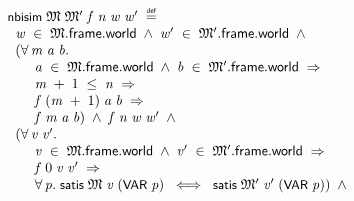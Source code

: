 \documentclass[letterpaper]{article}
\renewcommand{\HOLConst}[1]{{\textsf{\upshape\small #1}}}
\newenvironment{holmath}{\begin{displaymath}\begin{array}{l}}{\end{array}\end{displaymath}\ignorespacesafterend}
\begin{document}
\begin{holmath}
  \HOLConst{nbisim}\;\HOLFreeVar{\ensuremath{\mathfrak{M}}}\;\HOLFreeVar{\ensuremath{\mathfrak{M}'}}\;\HOLFreeVar{f}\;\HOLFreeVar{n}\;\HOLFreeVar{w}\;\HOLFreeVar{w\sp{\prime}}\;\HOLSymConst{\HOLTokenDefEquality{}}\\
\;\;\HOLFreeVar{w}\;\HOLSymConst{\HOLTokenIn{}}\;\HOLFreeVar{\ensuremath{\mathfrak{M}}}.\HOLFieldName{frame}.\HOLFieldName{world}\;\HOLSymConst{\HOLTokenConj{}}\;\HOLFreeVar{w\sp{\prime}}\;\HOLSymConst{\HOLTokenIn{}}\;\HOLFreeVar{\ensuremath{\mathfrak{M}'}}.\HOLFieldName{frame}.\HOLFieldName{world}\;\HOLSymConst{\HOLTokenConj{}}\\
\;\;(\HOLSymConst{\HOLTokenForall{}}\HOLBoundVar{m}\;\HOLBoundVar{a}\;\HOLBoundVar{b}.\\
\;\;\;\;\;\;\;\HOLBoundVar{a}\;\HOLSymConst{\HOLTokenIn{}}\;\HOLFreeVar{\ensuremath{\mathfrak{M}}}.\HOLFieldName{frame}.\HOLFieldName{world}\;\HOLSymConst{\HOLTokenConj{}}\;\HOLBoundVar{b}\;\HOLSymConst{\HOLTokenIn{}}\;\HOLFreeVar{\ensuremath{\mathfrak{M}'}}.\HOLFieldName{frame}.\HOLFieldName{world}\;\HOLSymConst{\HOLTokenImp{}}\\
\;\;\;\;\;\;\;\HOLBoundVar{m}\;\HOLSymConst{\ensuremath{+}}\;\HOLNumLit{1}\;\HOLSymConst{\HOLTokenLeq{}}\;\HOLFreeVar{n}\;\HOLSymConst{\HOLTokenImp{}}\\
\;\;\;\;\;\;\;\HOLFreeVar{f}\;(\HOLBoundVar{m}\;\HOLSymConst{\ensuremath{+}}\;\HOLNumLit{1})\;\HOLBoundVar{a}\;\HOLBoundVar{b}\;\HOLSymConst{\HOLTokenImp{}}\\
\;\;\;\;\;\;\;\HOLFreeVar{f}\;\HOLBoundVar{m}\;\HOLBoundVar{a}\;\HOLBoundVar{b})\;\HOLSymConst{\HOLTokenConj{}}\;\HOLFreeVar{f}\;\HOLFreeVar{n}\;\HOLFreeVar{w}\;\HOLFreeVar{w\sp{\prime}}\;\HOLSymConst{\HOLTokenConj{}}\\
\;\;(\HOLSymConst{\HOLTokenForall{}}\HOLBoundVar{v}\;\HOLBoundVar{v\sp{\prime}}.\\
\;\;\;\;\;\;\;\HOLBoundVar{v}\;\HOLSymConst{\HOLTokenIn{}}\;\HOLFreeVar{\ensuremath{\mathfrak{M}}}.\HOLFieldName{frame}.\HOLFieldName{world}\;\HOLSymConst{\HOLTokenConj{}}\;\HOLBoundVar{v\sp{\prime}}\;\HOLSymConst{\HOLTokenIn{}}\;\HOLFreeVar{\ensuremath{\mathfrak{M}'}}.\HOLFieldName{frame}.\HOLFieldName{world}\;\HOLSymConst{\HOLTokenImp{}}\\
\;\;\;\;\;\;\;\HOLFreeVar{f}\;\HOLNumLit{0}\;\HOLBoundVar{v}\;\HOLBoundVar{v\sp{\prime}}\;\HOLSymConst{\HOLTokenImp{}}\\
\;\;\;\;\;\;\;\HOLSymConst{\HOLTokenForall{}}\HOLBoundVar{p}.\;\HOLConst{satis}\;\HOLFreeVar{\ensuremath{\mathfrak{M}}}\;\HOLBoundVar{v}\;(\HOLConst{VAR}\;\HOLBoundVar{p})\;\HOLSymConst{\HOLTokenEquiv{}}\;\HOLConst{satis}\;\HOLFreeVar{\ensuremath{\mathfrak{M}'}}\;\HOLBoundVar{v\sp{\prime}}\;(\HOLConst{VAR}\;\HOLBoundVar{p}))\;\HOLSymConst{\HOLTokenConj{}}\\

\end{holmath}
\end{document}
